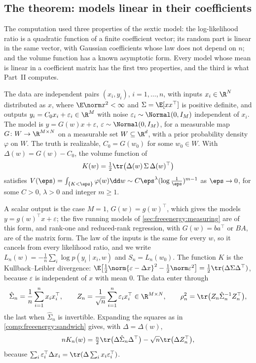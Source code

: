 \begin{refsection}
\section{The theorem: models linear in their coefficients}\label{sec:freeenergy:linear}

The computation used three properties of the sextic model: the log-likelihood ratio is a quadratic function of a finite coefficient vector; its random part is linear in the same vector, with Gaussian coefficients whose law does not depend on $n$; and the volume function has a known asymptotic form. Every model whose mean is linear in a coefficient matrix has the first two properties, and the third is what Part~II computes.

\begin{assumption}\label{ass:freeenergy:linear}
The data are independent pairs $(x_i,y_i)$, $i=1,\dots,n$, with inputs $x_i\in\R^N$ distributed as $x$, where $\E\norm x^2<\infty$ and $\Sigma=\E[xx^\top]$ is positive definite, and outputs $y_i=C_0x_i+\varepsilon_i\in\R^M$ with noise $\varepsilon_i\sim\Normal(0,I_M)$ independent of $x_i$. The model is $y=G(w)x+\varepsilon$, $\varepsilon\sim\Normal(0,I_M)$, for a measurable map $G\colon W\to\R^{M\times N}$ on a measurable set $W\subseteq\R^d$, with a prior probability density $\varphi$ on $W$. The truth is realizable, $C_0=G(w_0)$ for some $w_0\in W$. With $\Delta(w)=G(w)-C_0$, the volume function of
\[
K(w)=\tfrac12\tr\bigl(\Delta(w)\,\Sigma\,\Delta(w)^\top\bigr)
\]
satisfies $V(\eps)=\int_{\{K<\eps\}}\varphi(w)\dd w\sim C\eps^\lambda(\log\tfrac1\eps)^{m-1}$ as $\eps\to0$, for some $C>0$, $\lambda>0$ and integer $m\ge1$.
\end{assumption}

A scalar output is the case $M=1$, $G(w)=g(w)^\top$, which gives the models $y=g(w)^\top x+\varepsilon$; the five running models of \cref{sec:freeenergy:measuring} are of this form, and rank-one and reduced-rank regression, with $G(w)=ba^\top$ or $BA$, are of the matrix form. The law of the inputs is the same for every $w$, so it cancels from every likelihood ratio, and we write $L_n(w)=-\frac1n\sum_i\log p(y_i\mid x_i,w)$ and $S_n=L_n(w_0)$. The function $K$ is the Kullback--Leibler divergence: $\E\bigl[\tfrac12\norm{\varepsilon-\Delta x}^2-\tfrac12\norm\varepsilon^2\bigr]=\tfrac12\tr(\Delta\Sigma\Delta^\top)$, because $\varepsilon$ is independent of $x$ with mean $0$. The data enter through
\[
\hat\Sigma_n=\frac1n\sum_{i=1}^nx_ix_i^\top,\qquad Z_n=\frac1{\sqrt n}\sum_{i=1}^n\varepsilon_ix_i^\top\in\R^{M\times N},\qquad \rho_n^2=\tr\bigl(Z_n\hat\Sigma_n^{-1}Z_n^\top\bigr),
\]
the last when $\hat\Sigma_n$ is invertible. Expanding the squares as in \cref{comp:freeenergy:sandwich} gives, with $\Delta=\Delta(w)$,
\begin{equation}\label{eq:freeenergy:energy}
nK_n(w)=\tfrac n2\tr\bigl(\Delta\hat\Sigma_n\Delta^\top\bigr)-\sqrt n\tr\bigl(\Delta Z_n^\top\bigr),
\end{equation}
because $\sum_i\varepsilon_i^\top\Delta x_i=\tr(\Delta\sum_ix_i\varepsilon_i^\top)$.


\end{refsection}
